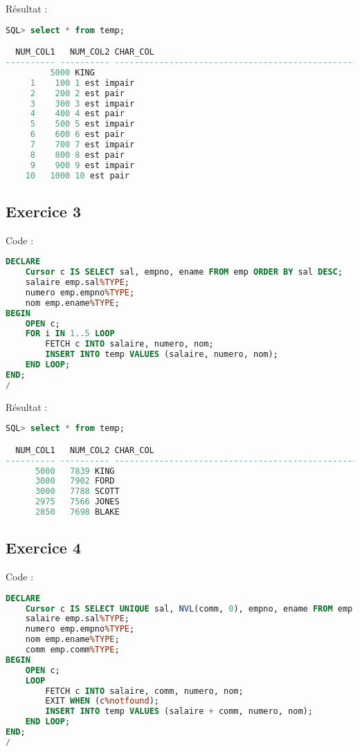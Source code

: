 \documentclass{article}
\begin{document}
Résultat :
\begin{lstlisting}[language=SQL,
    morekeywords={DECLARE, LOOP, TYPE, FOR, IF, IS, OPEN, FETCH, DBMS_OUTPUT, PUT_LINE}]
SQL> select * from temp;

  NUM_COL1   NUM_COL2 CHAR_COL
---------- ---------- -------------------------------------------------------
		 5000 KING
	 1	  100 1 est impair
	 2	  200 2 est pair
	 3	  300 3 est impair
	 4	  400 4 est pair
	 5	  500 5 est impair
	 6	  600 6 est pair
	 7	  700 7 est impair
	 8	  800 8 est pair
	 9	  900 9 est impair
	10	 1000 10 est pair
\end{lstlisting}

\subsection{Exercice 3}
Code :
\begin{lstlisting}[language=SQL,
    deletekeywords={char},
    morekeywords={DECLARE, LOOP, TYPE, FOR, IF, IS, OPEN, FETCH, DBMS_OUTPUT, PUT_LINE}]
DECLARE
	Cursor c IS SELECT sal, empno, ename FROM emp ORDER BY sal DESC;
	salaire emp.sal%TYPE;
	numero emp.empno%TYPE;
	nom emp.ename%TYPE;
BEGIN
	OPEN c;
	FOR i IN 1..5 LOOP
		FETCH c INTO salaire, numero, nom;
		INSERT INTO temp VALUES (salaire, numero, nom);
	END LOOP;
END;
/
\end{lstlisting}

Résultat :
\begin{lstlisting}[language=SQL,
    morekeywords={DECLARE, LOOP, TYPE, FOR, IF, IS, OPEN, FETCH, DBMS_OUTPUT, PUT_LINE}]
SQL> select * from temp;

  NUM_COL1   NUM_COL2 CHAR_COL
---------- ---------- -------------------------------------------------------
      5000	 7839 KING
      3000	 7902 FORD
      3000	 7788 SCOTT
      2975	 7566 JONES
      2850	 7698 BLAKE
\end{lstlisting}

\subsection{Exercice 4}
Code :
\begin{lstlisting}[language=SQL,
    deletekeywords={char},
    morekeywords={DECLARE, LOOP, TYPE, FOR, IF, IS, OPEN, FETCH, DBMS_OUTPUT, PUT_LINE}]
DECLARE
    Cursor c IS SELECT UNIQUE sal, NVL(comm, 0), empno, ename FROM emp WHERE sal + NVL(comm, 0) > 2000;
    salaire emp.sal%TYPE;
    numero emp.empno%TYPE;
    nom emp.ename%TYPE;
    comm emp.comm%TYPE;
BEGIN
	OPEN c;
	LOOP
		FETCH c INTO salaire, comm, numero, nom;
		EXIT WHEN (c%notfound);
		INSERT INTO temp VALUES (salaire + comm, numero, nom);
	END LOOP;
END;
/
\end{lstlisting}
\end{document}
